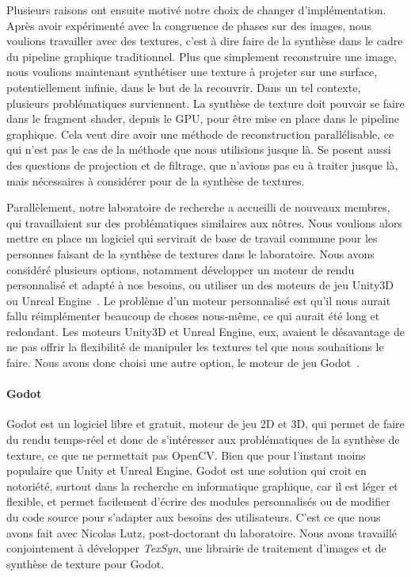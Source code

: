 \bigskip

Plusieurs raisons ont ensuite motivé notre choix de changer d'implémentation. Après avoir expérimenté avec la congruence de phases sur des images, nous voulions travailler avec des textures, c'est à dire faire de la synthèse dans le cadre du pipeline graphique traditionnel. Plus que simplement reconstruire une image, nous voulions maintenant synthétiser une texture à projeter sur une surface, potentiellement infinie, dans le but de la recouvrir. Dans un tel contexte, plusieurs problématiques surviennent. La synthèse de texture doit pouvoir se faire dans le fragment shader, depuis le GPU, pour être mise en place dans le pipeline graphique. Cela veut dire avoir une méthode de reconstruction parallélisable, ce qui n'est pas le cas de la méthode que nous utilisions jusque là. Se posent aussi des questions de projection et de filtrage, que n'avions pas eu à traiter jusque là, mais nécessaires à considérer pour de la synthèse de textures.

Parallèlement, notre laboratoire de recherche a accueilli de nouveaux membres, qui travaillaient sur des problématiques similaires aux nôtres. Nous voulions alors mettre en place un logiciel qui servirait de base de travail commune pour les personnes faisant de la synthèse de textures dans le laboratoire. Nous avons considéré plusieurs options, notamment développer un moteur de rendu personnalisé et adapté à nos besoins, ou utiliser un des moteurs de jeu Unity3D~\cite{unity_engine} ou Unreal Engine~\cite{unreal_engine}. Le problème d'un moteur personnalisé est qu'il nous aurait fallu réimplémenter beaucoup de choses nous-même, ce qui aurait été long et redondant. Les moteurs Unity3D et Unreal Engine, eux, avaient le désavantage de ne pas offrir la flexibilité de manipuler les textures tel que nous souhaitions le faire. Nous avons donc choisi une autre option, le moteur de jeu Godot~\cite{godot_game_engine}.

\paragraph{Godot}

Godot est un logiciel libre et gratuit, moteur de jeu 2D et 3D, qui permet de faire du rendu temps-réel et donc de s'intéresser aux problématiques de la synthèse de texture, ce que ne permettait pas OpenCV. Bien que pour l'instant moins populaire que Unity et Unreal Engine, Godot est une solution qui croit en notoriété, surtout dans la recherche en informatique graphique, car il est léger et flexible, et permet facilement d'écrire des modules personnalisés ou de modifier du code source pour s'adapter aux besoins des utilisateurs. C'est ce que nous avons fait avec Nicolas Lutz, post-doctorant du laboratoire. Nous avons travaillé conjointement à développer \textit{TexSyn}, une librairie \cpp de traitement d'images et de synthèse de texture pour Godot.

